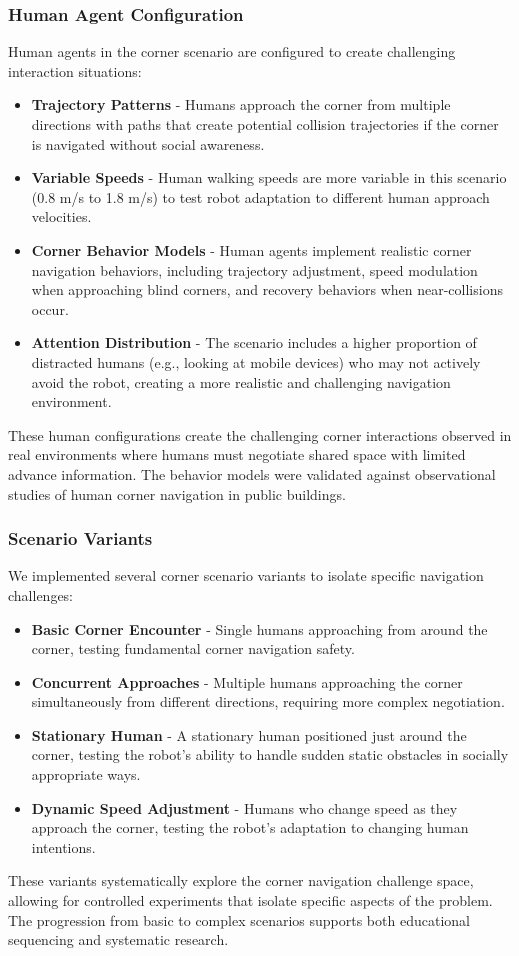 \subsubsection{Human Agent Configuration}
Human agents in the corner scenario are configured to create challenging interaction 
situations:
\begin{itemize}
    \item \textbf{Trajectory Patterns} - Humans approach the corner from multiple 
    directions with paths that create potential collision trajectories if the corner 
    is navigated without social awareness.
    \item \textbf{Variable Speeds} - Human walking speeds are more variable in this 
    scenario (0.8 m/s to 1.8 m/s) to test robot adaptation to different human 
    approach velocities.
    \item \textbf{Corner Behavior Models} - Human agents implement realistic corner 
    navigation behaviors, including trajectory adjustment, speed modulation when 
    approaching blind corners, and recovery behaviors when near-collisions occur.
    \item \textbf{Attention Distribution} - The scenario includes a higher proportion 
    of distracted humans (e.g., looking at mobile devices) who may not actively avoid 
    the robot, creating a more realistic and challenging navigation environment.
\end{itemize}
These human configurations create the challenging corner interactions observed in 
real environments where humans must negotiate shared space with limited advance 
information. The behavior models were validated against observational studies of 
human corner navigation in public buildings.

\subsubsection{Scenario Variants}
We implemented several corner scenario variants to isolate specific navigation challenges:
\begin{itemize}
    \item \textbf{Basic Corner Encounter} - Single humans approaching from around 
    the corner, testing fundamental corner navigation safety.
    \item \textbf{Concurrent Approaches} - Multiple humans approaching the corner 
    simultaneously from different directions, requiring more complex negotiation.
    \item \textbf{Stationary Human} - A stationary human positioned just around the 
    corner, testing the robot's ability to handle sudden static obstacles in socially 
    appropriate ways.
    \item \textbf{Dynamic Speed Adjustment} - Humans who change speed as they approach 
    the corner, testing the robot's adaptation to changing human intentions.
\end{itemize}
These variants systematically explore the corner navigation challenge space, allowing 
for controlled experiments that isolate specific aspects of the problem. The progression 
from basic to complex scenarios supports both educational sequencing and systematic research.

